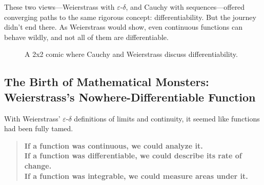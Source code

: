 \bigskip

These two views—Weierstrass with \( \varepsilon \)-\( \delta \), and Cauchy with sequences—offered converging paths to the same rigorous concept: differentiability. But the journey didn’t end there. As Weierstrass would show, even continuous functions can behave wildly, and not all of them are differentiable.


\begin{figure}[H]
\centering
{}
\caption{A 2x2 comic where Cauchy and Weierstrass discuss differentiability.}
\end{figure}










\subsection{The Birth of Mathematical Monsters: Weierstrass’s Nowhere-Differentiable Function}

With Weierstrass’ \(\varepsilon\)-\(\delta\) definitions of limits and continuity, it seemed like functions had been fully tamed.

\begin{quote}
\textbf{If a function was continuous, we could analyze it.}\\
\textbf{If a function was differentiable, we could describe its rate of change.}\\
\textbf{If a function was integrable, we could measure areas under it.}
\end{quote}

